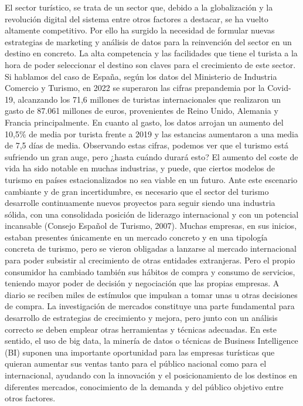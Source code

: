 \documentclass[
  letterpaper,
  DIV=11,
  numbers=noendperiod]{scrreprt}
\begin{document}
El sector turístico, se trata de un sector que, debido a la
globalización y la revolución digital del sistema entre otros factores a
destacar, se ha vuelto altamente competitivo. Por ello ha surgido la
necesidad de formular nuevas estrategias de marketing y análisis de
datos para la reinvención del sector en un destino en concreto. La alta
competencia y las facilidades que tiene el turista a la hora de poder
seleccionar el destino son claves para el crecimiento de este sector. Si
hablamos del caso de España, según los datos del Ministerio de Industria
Comercio y Turismo, en 2022 se superaron las cifras prepandemia por la
Covid-19, alcanzando los 71,6 millones de turistas internacionales que
realizaron un gasto de 87.061 millones de euros, provenientes de Reino
Unido, Alemania y Francia principalmente. En cuanto al gasto, los datos
arrojan un aumento del 10,5\% de media por turista frente a 2019 y las
estancias aumentaron a una media de 7,5 días de media. Observando estas
cifras, podemos ver que el turismo está sufriendo un gran auge, pero
¿hasta cuándo durará esto? El aumento del coste de vida ha sido notable
en muchas industrias, y puede, que ciertos modelos de turismo en países
estacionalizados no sea viable en un futuro. Ante este escenario
cambiante y de gran incertidumbre, es necesario que el sector del
turismo desarrolle continuamente nuevos proyectos para seguir siendo una
industria sólida, con una consolidada posición de liderazgo
internacional y con un potencial incansable (Consejo Español de Turismo,
2007). Muchas empresas, en sus inicios, estaban presentes únicamente en
un mercado concreto y en una tipología concreta de turismo, pero se
vieron obligadas a lanzarse al mercado internacional para poder
subsistir al crecimiento de otras entidades extranjeras. Pero el propio
consumidor ha cambiado también sus hábitos de compra y consumo de
servicios, teniendo mayor poder de decisión y negociación que las
propias empresas. A diario se reciben miles de estímulos que impulsan a
tomar unas u otras decisiones de compra. La investigación de mercados
constituye una parte fundamental para desarrollo de estrategias de
crecimiento y mejora, pero junto con un análisis correcto se deben
emplear otras herramientas y técnicas adecuadas. En este sentido, el uso
de big data, la minería de datos o técnicas de Business Intelligence
(BI) suponen una importante oportunidad para las empresas turísticas que
quieran aumentar sus ventas tanto para el público nacional como para el
internacional, ayudando con la innovación y el posicionamiento de los
destinos en diferentes mercados, conocimiento de la demanda y del
público objetivo entre otros factores.
\end{document}

